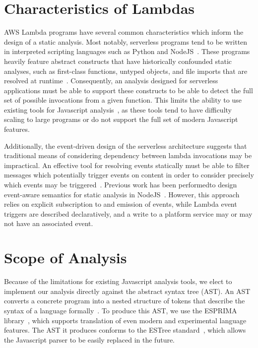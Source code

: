 \documentclass[letterpaper,twocolumn,10pt]{article}
\begin{document}
\section{Characteristics of Lambdas}
AWS Lambda programs have several common characteristics which inform the design of a static analysis. Most notably, serverless programs tend to be written in interpreted scripting languages such as Python and NodeJS~\cite{trends}. These programs heavily feature abstract constructs that have historically confounded static analyses, such as first-class functions, untyped objects, and file imports that are resolved at runtime~\cite{scriptingchallenges}. Consequently, an analysis designed for serverless applications must be able to support these constructs to be able to detect the full set of possible invocations from a given function. This limits the ability to use existing tools for Javascript analysis~\cite{WALA,jssafe,arctarus}, as these tools tend to have difficulty scaling to large programs or do not support the full set of modern Javascript features.\par

Additionally, the event-driven design of the serverless architecture suggests that traditional means of considering dependency between lambda invocations may be impractical. An effective tool for resolving events statically must be able to filter messages which potentially trigger events on content in order to consider precisely which events may be triggered~\cite{debs}. Previous work has been performedto design event-aware semantics for static analysis in NodeJS~\cite{nodejscallgraph}. However, this approach relies on explicit subscription to and emission of events, while Lambda event triggers are described declaratively, and a write to a platform service may or may not have an associated event. \par





\section{Scope of Analysis}

Because of the limitations for existing Javascript analysis tools, we elect to implement our analysis directly against the abstract syntax tree (AST). An AST converts a concrete program into a nested structure of tokens that describe the syntax of a language formally~\cite{ast}. To produce this AST, we use the ESPRIMA library~\cite{esprima}, which supports translation of even modern and experimental language features. The AST it produces conforms to the ESTree standard~\cite{estree}, which allows the Javascript parser to be easily replaced in the future. \par
\end{document}
